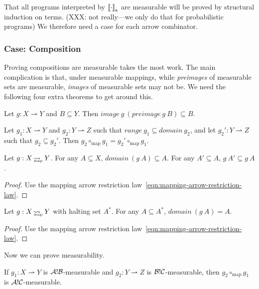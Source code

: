 \documentclass[preprint]{sigplanconf}
\newcommand{\arrow}{\rightsquigarrow}
\newcommand{\pto}{\rightharpoonup}
\newcommand{\gen}{_\mathrm{a}}
\newcommand{\map}{_\mathrm{map}}
\DeclareMathOperator{\mapto}{\arrow_{\mspace{-21mu}\map}}
\begin{document}
That all programs interpreted by $\meaningof{\cdot}\gen$ are measurable will be proved by structural induction on terms. (XXX: not really---we only do that for probabilistic programs)
We therefore need a case for each arrow combinator.

\subsubsection{Case: Composition}

Proving compositions are measurable takes the most work.
The main complication is that, under measurable mappings, while \emph{preimages} of measurable sets are measurable, \emph{images} of measurable sets may not be.
We need the following four extra theorems to get around this.

\begin{lemma}
Let $g : X \pto Y$ and $B \subseteq Y$. Then $image~g~(preimage~g~B) \subseteq B$.
\label{lem:images-of-preimages}
\end{lemma}

\begin{lemma}
Let $g_1 : X \pto Y$ and $g_2 : Y \pto Z$ such that $range~g_1 \subseteq domain~g_2$, and let $g_2' : Y \pto Z$ such that $g_2 \subseteq g_2'$.
Then $g_2 \circ\map g_1 = g_2' \circ\map g_1$.
\label{lem:composition-expansion}
\end{lemma}

\begin{theorem}
Let $g : X \mapto Y$.
For any $A \subseteq X$, $domain~(g~A) \subseteq A$.
For any $A' \subseteq A$, $g~A' \subseteq g~A$.
\label{thm:mapping-arrow-monotonicity}
\end{theorem}
\begin{proof}
Use the mapping arrow restriction law~\eqref{eqn:mapping-arrow-restriction-law}.
\end{proof}

\begin{theorem}
Let $g : X \mapto Y$ with halting set $A^*$. For any $A \subseteq A^*$, $domain~(g~A) = A$.
\label{thm:halting-subsets}
\end{theorem}
\begin{proof}
Use the mapping arrow restriction law~\eqref{eqn:mapping-arrow-restriction-law}.
\end{proof}

Now we can prove measurability.

\begin{lemma}[measurability under $\circ\map$]
If $g_1 : X \pto Y$ is $\mathcal{A}!\mathcal{B}$-measurable and $g_2 : Y \pto Z$ is $\mathcal{B}!\mathcal{C}$-measurable, then $g_2 \circ\map g_1$ is $\mathcal{A}!\mathcal{C}$-measurable.
\label{lem:compositions-are-measurable}
\end{lemma}
\end{document}
